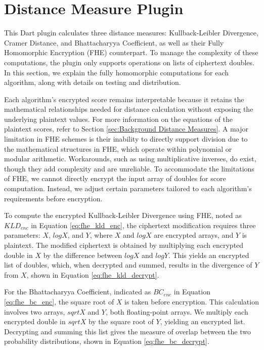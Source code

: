 \section{Distance Measure Plugin}
\label{sec:Distance Measure Plugin}
This Dart plugin calculates three distance measures: Kullback-Leibler Divergence, Cramer Distance, and Bhattacharyya Coefficient, as well as their Fully Homomorphic Encryption (FHE) counterpart. To manage the complexity of these computations, the plugin only supports operations on lists of ciphertext doubles. In this section, we explain the fully homomorphic computations for each algorithm, along with details on testing and distribution.

Each algorithm’s encrypted score remains interpretable because it retains the mathematical relationships needed for distance calculation without exposing the underlying plaintext values. For more information on the equations of the plaintext scores, refer to Section \ref{sec:Background Distance Measures}. A major limitation in FHE schemes is their inability to directly support division due to the mathematical structures in FHE, which operate within polynomial or modular arithmetic. Workarounds, such as using multiplicative inverses, do exist, though they add complexity and are unreliable. To accommodate the limitations of FHE, we cannot directly encrypt the input array of doubles for score computation. Instead, we adjust certain parameters tailored to each algorithm’s requirements before encryption.

To compute the encrypted Kullback-Leibler Divergence using FHE, noted as $KLD_{enc}$ in Equation \ref{eq:fhe_kld_enc}, the ciphertext modification requires three parameters: $X$, $logX$, and $Y$, where $X$ and $logX$ are encrypted arrays, and $Y$ is plaintext. The modified ciphertext is obtained by multiplying each encrypted double in $X$ by the difference between $logX$ and $logY$. This yields an encrypted list of doubles, which, when decrypted and summed, results in the divergence of $Y$ from $X$, shown in Equation \ref{eq:fhe_kld_decrypt}.





For the Bhattacharyya Coefficient, indicated as $BC_{enc}$ in Equation \ref{eq:fhe_bc_enc}, the square root of $X$ is taken before encryption. This calculation involves two arrays, $sqrtX$ and $Y$, both floating-point arrays. We multiply each encrypted double in $sqrtX$ by the square root of $Y$, yielding an encrypted list. Decrypting and summing this list gives the measure of overlap between the two probability distributions, shown in Equation \ref{eq:fhe_bc_decrypt}.

